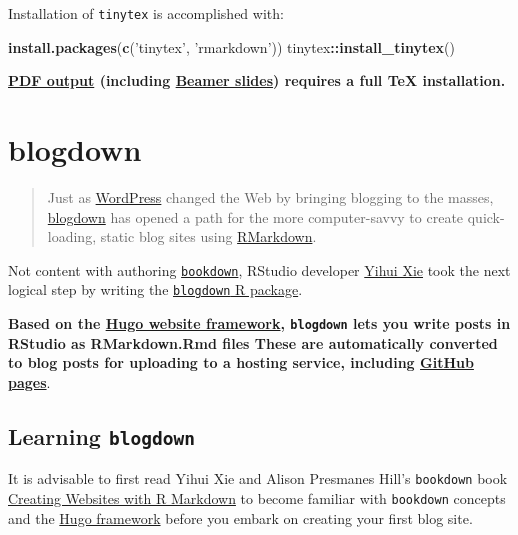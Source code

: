 \documentclass[]{book}
\newenvironment{Shaded}{\begin{snugshade}}{\end{snugshade}}
\newcommand{\KeywordTok}[1]{\textcolor[rgb]{0.13,0.29,0.53}{\textbf{#1}}}
\newcommand{\NormalTok}[1]{#1}
\newcommand{\OperatorTok}[1]{\textcolor[rgb]{0.81,0.36,0.00}{\textbf{#1}}}
\newcommand{\StringTok}[1]{\textcolor[rgb]{0.31,0.60,0.02}{#1}}
\theoremstyle{definition}
\theoremstyle{definition}
\theoremstyle{definition}
\theoremstyle{remark}
\begin{document}
Installation of \texttt{tinytex} is accomplished with:

\begin{Shaded}
\begin{Highlighting}[]
\KeywordTok{install.packages}\NormalTok{(}\KeywordTok{c}\NormalTok{(}\StringTok{'tinytex'}\NormalTok{, }\StringTok{'rmarkdown'}\NormalTok{))}
\NormalTok{tinytex}\OperatorTok{::}\KeywordTok{install_tinytex}\NormalTok{()}
\end{Highlighting}
\end{Shaded}

{}
\textbf{\href{https://rmarkdown.rstudio.com/pdf_document_format.html}{PDF
output} (including
\href{https://rmarkdown.rstudio.com/beamer_presentation_format.html}{Beamer
slides}) requires a full TeX installation.}

\hypertarget{blogdown}{%
\section{blogdown}\label{blogdown}}

\begin{quote}
Just as \href{https://wordpress.com/}{WordPress} changed the Web by
bringing blogging to the masses,
\href{https://bookdown.org/yihui/blogdown/}{blogdown} has opened a path
for the more computer-savvy to create quick-loading, static blog sites
using \protect\hyperlink{rmarkdown}{RMarkdown}.
\end{quote}

Not content with authoring
\protect\hyperlink{bookdown}{\texttt{bookdown}}, RStudio developer
\href{http://yihui.name}{Yihui Xie} took the next logical step by
writing the
\href{https://bookdown.org/yihui/blogdown/}{\texttt{blogdown} R
package}.

\textbf{Based on the \href{https://gohugo.io/}{Hugo website framework},
\texttt{blogdown} lets you write posts in RStudio as RMarkdown.Rmd files
These are automatically converted to blog posts for uploading to a
hosting service, including \href{https://pages.github.com/}{GitHub
pages}}.

\hypertarget{learning-blogdown}{%
\subsection{\texorpdfstring{Learning
\texttt{blogdown}}{Learning blogdown}}\label{learning-blogdown}}

It is advisable to first read Yihui Xie and Alison Presmanes Hill's
\texttt{bookdown} book
\href{https://bookdown.org/yihui/blogdown/}{Creating Websites with R
Markdown} to become familiar with \texttt{bookdown} concepts and the
\href{https://gohugo.io/}{Hugo framework} before you embark on creating
your first blog site.
\end{document}

